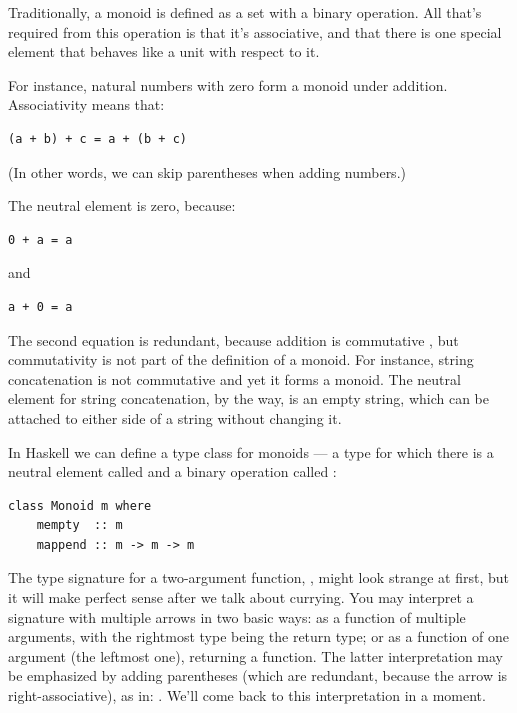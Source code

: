 Traditionally, a monoid is defined as a set with a binary operation. All
that's required from this operation is that it's associative, and that
there is one special element that behaves like a unit with respect to
it.

For instance, natural numbers with zero form a monoid under addition.
Associativity means that:

\begin{verbatim}
(a + b) + c = a + (b + c)
\end{verbatim}

(In other words, we can skip parentheses when adding numbers.)

The neutral element is zero, because:

\begin{verbatim}
0 + a = a
\end{verbatim}

and

\begin{verbatim}
a + 0 = a
\end{verbatim}

The second equation is redundant, because addition is commutative , but commutativity is not part of the definition of a monoid.
For instance, string concatenation is not commutative and yet it forms a
monoid. The neutral element for string concatenation, by the way, is an
empty string, which can be attached to either side of a string without
changing it.

In Haskell we can define a type class for monoids --- a type for which
there is a neutral element called  and a binary operation
called :

\begin{verbatim}
class Monoid m where
    mempty  :: m
    mappend :: m -> m -> m
\end{verbatim}

The type signature for a two-argument function,
, might look strange at first,
but it will make perfect sense after we talk about currying. You may
interpret a signature with multiple arrows in two basic ways: as a
function of multiple arguments, with the rightmost type being the return
type; or as a function of one argument (the leftmost one), returning a
function. The latter interpretation may be emphasized by adding
parentheses (which are redundant, because the arrow is
right-associative), as in: .
We'll come back to this interpretation in a moment.

